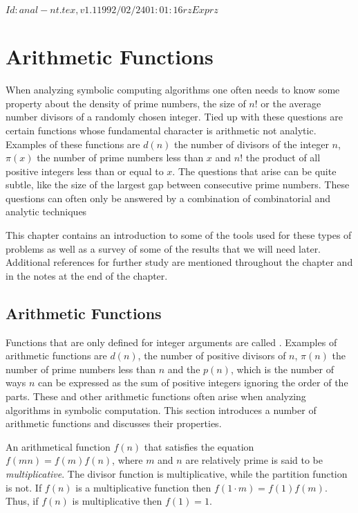 $Id: anal-nt.tex,v 1.1 1992/02/24 01:01:16 rz Exp rz $
\chapter{Arithmetic Functions}
\label{Analytic:NT:Chap}

When analyzing symbolic computing algorithms one often needs to know
some property about the density of prime numbers, the size of $n!$ or
the average number divisors of a randomly chosen integer.  Tied up
with these questions are certain functions whose fundamental character
is arithmetic not analytic.  Examples of these functions are $d(n)$
the number of divisors of the integer $n$, $\pi(x)$ the number of
prime numbers less than $x$ and $n!$ the product of all positive
integers less than or equal to $x$.  The questions that arise can be
quite subtle, like the size of the largest gap between consecutive
prime numbers.  These questions can often only be answered by a
combination of combinatorial and analytic techniques

This chapter contains an introduction to some of the tools used for
these types of problems as well as a survey of some of the results
that we will need later.   Additional references for further study are
mentioned throughout the chapter and in the notes at the end of the
chapter.

\section{Arithmetic Functions}
\label{Arithmetic:Functions:Sec}

Functions that are only defined for integer arguments are called
.  Examples of arithmetic functions are
$d(n)$, the number of positive divisors of $n$, $\pi(n)$ the number of
prime numbers less than $n$ and the  $p(n)$,
which is the number of ways $n$ can be expressed as the sum of positive
integers ignoring the order of the parts.  These and other arithmetic
functions often arise when analyzing algorithms in symbolic
computation.  This section introduces a number of arithmetic functions
and discusses their properties.

An arithmetical function $f(n)$ that satisfies the equation $f(mn) =
f(m) f(n)$, where $m$ and $n$ are relatively prime is said to be {\em
multiplicative}.  The divisor function
is multiplicative, while the partition function is not.  If $f(n)$ is
a multiplicative function then $f(1 \cdot m) = f(1) f(m)$.  Thus, if
$f(n)$ is multiplicative then $f(1) = 1$.

